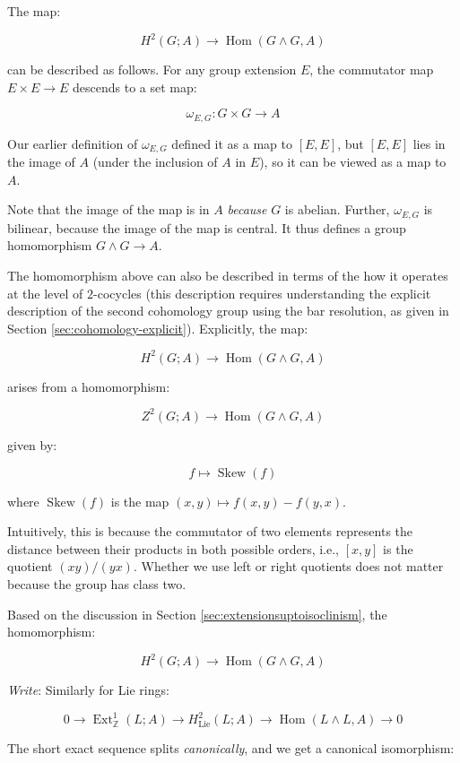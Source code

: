 \documentclass[10pt]{amsart}
\begin{document}
The map:

$$H^2(G;A) \to \operatorname{Hom}(G \wedge G,A)$$

can be described as follows. For any group extension $E$, the
commutator map $E \times E \to E$ descends to a set map:

$$\omega_{E,G}: G \times G \to A$$

Our earlier definition of $\omega_{E,G}$ defined it as a map to
$[E,E]$, but $[E,E]$ lies in the image of $A$ (under the inclusion of
$A$ in $E$), so it can be viewed as a map to $A$.

Note that the image of the map is in $A$ {\em because} $G$ is
abelian. Further, $\omega_{E,G}$ is bilinear, because the image of the map
is central. It thus defines a group homomorphism $G \wedge G \to A$.

The homomorphism above can also be described in terms of the how it
operates at the level of $2$-cocycles (this description requires
understanding the explicit description of the second cohomology group
using the bar resolution, as given in Section
\ref{sec:cohomology-explicit}). Explicitly, the map:

$$H^2(G;A) \to \operatorname{Hom}(G \wedge G,A)$$

arises from a homomorphism:

$$Z^2(G;A) \to \operatorname{Hom}(G \wedge G,A)$$

given by:

$$f \mapsto \operatorname{Skew}(f)$$

where $\operatorname{Skew}(f)$ is the map $(x,y) \mapsto f(x,y) -
f(y,x)$.

Intuitively, this is because the commutator of two elements represents
the distance between their products in both possible orders, i.e.,
$[x,y]$ is the quotient $(xy)/(yx)$. Whether we use left or right
quotients does not matter because the group has class two.

Based on the discussion in Section \ref{sec:extensionsuptoisoclinism},
the homomorphism:

$$H^2(G;A) \to \operatorname{Hom}(G \wedge G,A)$$

{\em Write}: Similarly for Lie rings:

\begin{equation}\label{eq:ses-uct-lie-abelian}
0 \to \operatorname{Ext}^1_{\mathbb{Z}}(L;A) \to H^2_{\text{Lie}}(L;A) \to \operatorname{Hom}(L \wedge L, A) \to 0
\end{equation}

The short exact sequence splits {\em canonically}, and we get a
canonical isomorphism:
\end{document}
